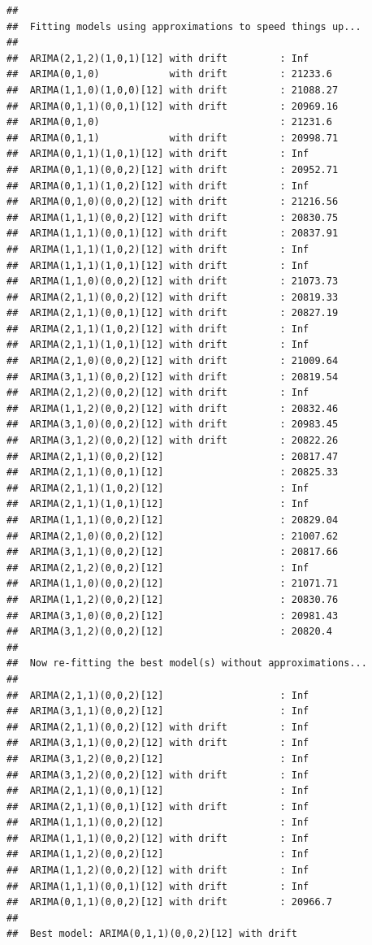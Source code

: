 \documentclass[12pt,]{article}
\begin{document}
\begin{verbatim}
## 
##  Fitting models using approximations to speed things up...
## 
##  ARIMA(2,1,2)(1,0,1)[12] with drift         : Inf
##  ARIMA(0,1,0)            with drift         : 21233.6
##  ARIMA(1,1,0)(1,0,0)[12] with drift         : 21088.27
##  ARIMA(0,1,1)(0,0,1)[12] with drift         : 20969.16
##  ARIMA(0,1,0)                               : 21231.6
##  ARIMA(0,1,1)            with drift         : 20998.71
##  ARIMA(0,1,1)(1,0,1)[12] with drift         : Inf
##  ARIMA(0,1,1)(0,0,2)[12] with drift         : 20952.71
##  ARIMA(0,1,1)(1,0,2)[12] with drift         : Inf
##  ARIMA(0,1,0)(0,0,2)[12] with drift         : 21216.56
##  ARIMA(1,1,1)(0,0,2)[12] with drift         : 20830.75
##  ARIMA(1,1,1)(0,0,1)[12] with drift         : 20837.91
##  ARIMA(1,1,1)(1,0,2)[12] with drift         : Inf
##  ARIMA(1,1,1)(1,0,1)[12] with drift         : Inf
##  ARIMA(1,1,0)(0,0,2)[12] with drift         : 21073.73
##  ARIMA(2,1,1)(0,0,2)[12] with drift         : 20819.33
##  ARIMA(2,1,1)(0,0,1)[12] with drift         : 20827.19
##  ARIMA(2,1,1)(1,0,2)[12] with drift         : Inf
##  ARIMA(2,1,1)(1,0,1)[12] with drift         : Inf
##  ARIMA(2,1,0)(0,0,2)[12] with drift         : 21009.64
##  ARIMA(3,1,1)(0,0,2)[12] with drift         : 20819.54
##  ARIMA(2,1,2)(0,0,2)[12] with drift         : Inf
##  ARIMA(1,1,2)(0,0,2)[12] with drift         : 20832.46
##  ARIMA(3,1,0)(0,0,2)[12] with drift         : 20983.45
##  ARIMA(3,1,2)(0,0,2)[12] with drift         : 20822.26
##  ARIMA(2,1,1)(0,0,2)[12]                    : 20817.47
##  ARIMA(2,1,1)(0,0,1)[12]                    : 20825.33
##  ARIMA(2,1,1)(1,0,2)[12]                    : Inf
##  ARIMA(2,1,1)(1,0,1)[12]                    : Inf
##  ARIMA(1,1,1)(0,0,2)[12]                    : 20829.04
##  ARIMA(2,1,0)(0,0,2)[12]                    : 21007.62
##  ARIMA(3,1,1)(0,0,2)[12]                    : 20817.66
##  ARIMA(2,1,2)(0,0,2)[12]                    : Inf
##  ARIMA(1,1,0)(0,0,2)[12]                    : 21071.71
##  ARIMA(1,1,2)(0,0,2)[12]                    : 20830.76
##  ARIMA(3,1,0)(0,0,2)[12]                    : 20981.43
##  ARIMA(3,1,2)(0,0,2)[12]                    : 20820.4
## 
##  Now re-fitting the best model(s) without approximations...
## 
##  ARIMA(2,1,1)(0,0,2)[12]                    : Inf
##  ARIMA(3,1,1)(0,0,2)[12]                    : Inf
##  ARIMA(2,1,1)(0,0,2)[12] with drift         : Inf
##  ARIMA(3,1,1)(0,0,2)[12] with drift         : Inf
##  ARIMA(3,1,2)(0,0,2)[12]                    : Inf
##  ARIMA(3,1,2)(0,0,2)[12] with drift         : Inf
##  ARIMA(2,1,1)(0,0,1)[12]                    : Inf
##  ARIMA(2,1,1)(0,0,1)[12] with drift         : Inf
##  ARIMA(1,1,1)(0,0,2)[12]                    : Inf
##  ARIMA(1,1,1)(0,0,2)[12] with drift         : Inf
##  ARIMA(1,1,2)(0,0,2)[12]                    : Inf
##  ARIMA(1,1,2)(0,0,2)[12] with drift         : Inf
##  ARIMA(1,1,1)(0,0,1)[12] with drift         : Inf
##  ARIMA(0,1,1)(0,0,2)[12] with drift         : 20966.7
## 
##  Best model: ARIMA(0,1,1)(0,0,2)[12] with drift
\end{verbatim}
\end{document}
